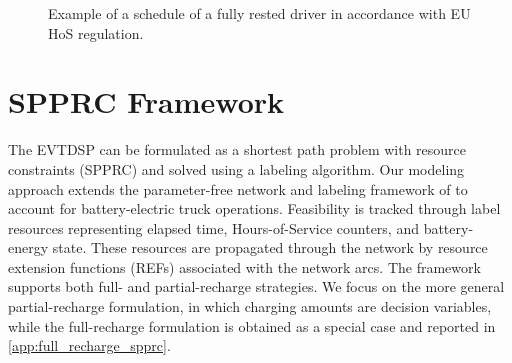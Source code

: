 \documentclass[3p,11pt,authoryear]{elsarticle}  %
\begin{document}
\begin{figure}[htbp!]
\centering
{}
\caption{Example of a schedule of a fully rested driver in accordance with EU HoS regulation.}
\label{fig:driver_schedule}
\end{figure}


%

    
    
    \section{ SPPRC Framework} 
    


The EVTDSP can be formulated as a shortest path problem with resource constraints (SPPRC) and solved using a labeling algorithm. Our modeling approach extends the parameter-free network and labeling framework of \citet{goel2017exact} to account for battery-electric truck operations. Feasibility is tracked through label resources representing elapsed time, Hours-of-Service counters, and battery-energy state. These resources are propagated through the network by resource extension functions (REFs) associated with the network arcs.
The framework supports both full- and partial-recharge strategies. We focus on the more general partial-recharge formulation, in which charging amounts are decision variables, while the full-recharge formulation is obtained as a special case and reported in \ref{app:full_recharge_spprc}. 
\end{document}

